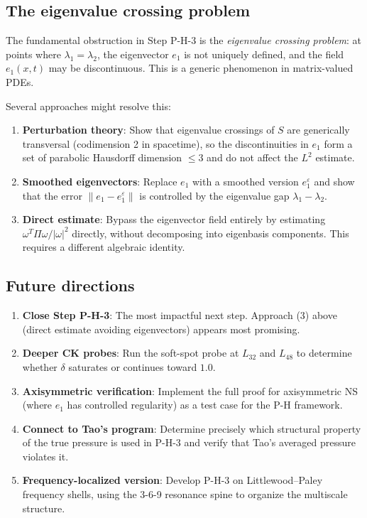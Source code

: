 \documentclass[11pt]{article}
\theoremstyle{definition}
\theoremstyle{remark}
\newcommand{\eps}{\varepsilon}
\begin{document}
\subsection{The eigenvalue crossing problem}

The fundamental obstruction in Step P-H-3 is the \emph{eigenvalue crossing problem}:
at points where $\lambda_1 = \lambda_2$, the eigenvector $e_1$ is not uniquely defined,
and the field $e_1(x,t)$ may be discontinuous.  This is a generic phenomenon in
matrix-valued PDEs.

Several approaches might resolve this:
\begin{enumerate}[nosep]
  \item \textbf{Perturbation theory}: Show that eigenvalue crossings of $S$ are
    generically transversal (codimension 2 in spacetime), so the discontinuities in
    $e_1$ form a set of parabolic Hausdorff dimension $\leq 3$ and do not affect
    the $L^2$ estimate.
  \item \textbf{Smoothed eigenvectors}: Replace $e_1$ with a smoothed version
    $e_1^\eps$ and show that the error $\|e_1 - e_1^\eps\|$ is controlled by the
    eigenvalue gap $\lambda_1 - \lambda_2$.
  \item \textbf{Direct estimate}: Bypass the eigenvector field entirely by estimating
    $\omega^T \Pi\omega / |\omega|^2$ directly, without decomposing into eigenbasis
    components.  This requires a different algebraic identity.
\end{enumerate}

\subsection{Future directions}

\begin{enumerate}[nosep]
  \item \textbf{Close Step P-H-3}: The most impactful next step.  Approach (3) above
    (direct estimate avoiding eigenvectors) appears most promising.
  \item \textbf{Deeper CK probes}: Run the soft-spot probe at $L_{32}$ and $L_{48}$
    to determine whether $\delta$ saturates or continues toward $1.0$.
  \item \textbf{Axisymmetric verification}: Implement the full proof for axisymmetric
    NS (where $e_1$ has controlled regularity) as a test case for the P-H framework.
  \item \textbf{Connect to Tao's program}: Determine precisely which structural
    property of the true pressure is used in P-H-3 and verify that Tao's averaged
    pressure violates it.
  \item \textbf{Frequency-localized version}: Develop P-H-3 on Littlewood--Paley
    frequency shells, using the 3-6-9 resonance spine to organize the multiscale
    structure.
\end{enumerate}
\end{document}
